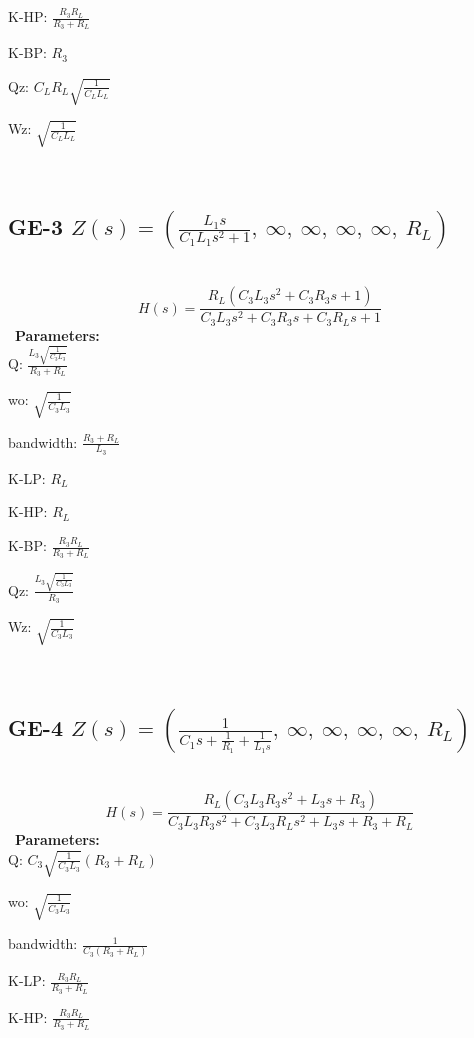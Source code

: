 \documentclass{article}
\begin{document}
K-HP: $\frac{R_{3} R_{L}}{R_{3} + R_{L}}$\ 

K-BP: $R_{3}$\ 

Qz: $C_{L} R_{L} \sqrt{\frac{1}{C_{L} L_{L}}}$\ 

Wz: $\sqrt{\frac{1}{C_{L} L_{L}}}$\ 

\ 

\subsection{GE-3 $Z(s) = \left( \frac{L_{1} s}{C_{1} L_{1} s^{2} + 1}, \  \infty, \  \infty, \  \infty, \  \infty, \  R_{L}\right)$ } \ 
\textbf{\[H(s) = \frac{R_{L} \left(C_{3} L_{3} s^{2} + C_{3} R_{3} s + 1\right)}{C_{3} L_{3} s^{2} + C_{3} R_{3} s + C_{3} R_{L} s + 1}\] } \ 
\textbf{Parameters:}\\ 

Q: $\frac{L_{3} \sqrt{\frac{1}{C_{3} L_{3}}}}{R_{3} + R_{L}}$\ 

wo: $\sqrt{\frac{1}{C_{3} L_{3}}}$\ 

bandwidth: $\frac{R_{3} + R_{L}}{L_{3}}$\ 

K-LP: $R_{L}$\ 

K-HP: $R_{L}$\ 

K-BP: $\frac{R_{3} R_{L}}{R_{3} + R_{L}}$\ 

Qz: $\frac{L_{3} \sqrt{\frac{1}{C_{3} L_{3}}}}{R_{3}}$\ 

Wz: $\sqrt{\frac{1}{C_{3} L_{3}}}$\ 

\ 

\subsection{GE-4 $Z(s) = \left( \frac{1}{C_{1} s + \frac{1}{R_{1}} + \frac{1}{L_{1} s}}, \  \infty, \  \infty, \  \infty, \  \infty, \  R_{L}\right)$ } \ 
\textbf{\[H(s) = \frac{R_{L} \left(C_{3} L_{3} R_{3} s^{2} + L_{3} s + R_{3}\right)}{C_{3} L_{3} R_{3} s^{2} + C_{3} L_{3} R_{L} s^{2} + L_{3} s + R_{3} + R_{L}}\] } \ 
\textbf{Parameters:}\\ 

Q: $C_{3} \sqrt{\frac{1}{C_{3} L_{3}}} \left(R_{3} + R_{L}\right)$\ 

wo: $\sqrt{\frac{1}{C_{3} L_{3}}}$\ 

bandwidth: $\frac{1}{C_{3} \left(R_{3} + R_{L}\right)}$\ 

K-LP: $\frac{R_{3} R_{L}}{R_{3} + R_{L}}$\ 

K-HP: $\frac{R_{3} R_{L}}{R_{3} + R_{L}}$\ 
\end{document}
